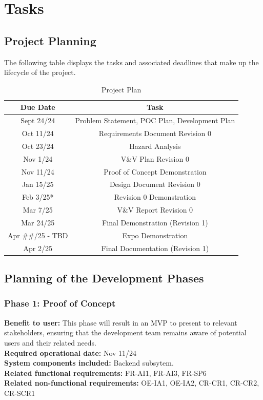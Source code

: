 \documentclass[12pt]{article}
\begin{document}
\section{Tasks}
\subsection{Project Planning}

The following table displays the tasks and associated deadlines that make up the lifecycle of the project.
\begin{table}
  \begin{tabular}{ |c|c| } 
    \hline
      \textbf{Due Date} & \textbf{Task} \\
    \hline
      Sept 24/24 & Problem Statement, POC Plan, Development Plan \\
    \hline
      Oct 11/24 & Requirements Document Revision 0 \\
    \hline
      Oct 23/24 & Hazard Analysis \\
    \hline
      Nov 1/24 & V\&V Plan Revision 0 \\
    \hline
      Nov 11/24 & Proof of Concept Demonstration \\
    \hline
      Jan 15/25 & Design Document Revision 0 \\
    \hline
      Feb 3/25* & Revision 0 Demonstration \\
    \hline
      Mar 7/25 & V\&V Report Revision 0 \\
    \hline
      Mar 24/25 & Final Demonstration (Revision 1) \\
    \hline
      Apr \#\#/25 - TBD & Expo Demonstration \\
    \hline
      Apr 2/25 & Final Documentation (Revision 1) \\
    \hline
  \end{tabular}
  \caption{Project Plan}
\end{table}



\subsection{Planning of the Development Phases}
\subsubsection*{Phase 1: Proof of Concept}
\textbf{Benefit to user:} This phase will result in an MVP to present to relevant stakeholders, ensuring that the development team remains aware of potential users and their related needs. \\
\textbf{Required operational date:} Nov 11/24 \\
\textbf{System components included:} Backend subsytem. \\
\textbf{Related functional requirements:} FR-AI1, FR-AI3, FR-SP6 \\
\textbf{Related non-functional requirements:} OE-IA1, OE-IA2, CR-CR1, CR-CR2, CR-SCR1 \\
\end{document}
